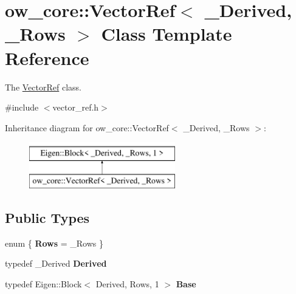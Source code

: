 \hypertarget{classow__core_1_1VectorRef}{}\section{ow\+\_\+core\+:\+:Vector\+Ref$<$ \+\_\+\+Derived, \+\_\+\+Rows $>$ Class Template Reference}
\label{classow__core_1_1VectorRef}


The \hyperlink{classow__core_1_1VectorRef}{Vector\+Ref} class.  




{\ttfamily \#include $<$vector\+\_\+ref.\+h$>$}

Inheritance diagram for ow\+\_\+core\+:\+:Vector\+Ref$<$ \+\_\+\+Derived, \+\_\+\+Rows $>$\+:\begin{figure}[H]
\begin{center}
\leavevmode
\includegraphics[height=2.000000cm]{de/d6a/classow__core_1_1VectorRef}
\end{center}
\end{figure}
\subsection*{Public Types}
\begin{DoxyCompactItemize}
\item 
enum \{ {\bfseries Rows} = \+\_\+\+Rows
 \}\hypertarget{classow__core_1_1VectorRef_a1fece9813818a7e76b4d602544b9459d}{}\label{classow__core_1_1VectorRef_a1fece9813818a7e76b4d602544b9459d}

\item 
typedef \+\_\+\+Derived {\bfseries Derived}\hypertarget{classow__core_1_1VectorRef_a7536251477ddb12a8c69099b2bd927f2}{}\label{classow__core_1_1VectorRef_a7536251477ddb12a8c69099b2bd927f2}

\item 
typedef Eigen\+::\+Block$<$ Derived, Rows, 1 $>$ {\bfseries Base}\hypertarget{classow__core_1_1VectorRef_a279d56c9662da5a4fbc798e5d554c273}{}\label{classow__core_1_1VectorRef_a279d56c9662da5a4fbc798e5d554c273}

\end{DoxyCompactItemize}
